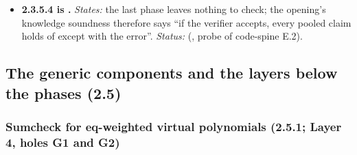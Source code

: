 \begin{itemize}[label={}, leftmargin=1.3em, itemindent=-1.3em, labelwidth=0pt, labelsep=0pt, itemsep=4pt, topsep=3pt]
\begin{itemize}[label={}, leftmargin=1.3em, itemindent=-1.3em, labelwidth=0pt, labelsep=0pt, itemsep=4pt, topsep=3pt]
\item {}\label{obl:node-2.3.5.3.1}\textbf{2.3.5.3.1 A column claim is a weighted claim} (, ; , , ). \emph{States:} a claim on column  at  is the weighted claim with weight ; the strided limb claims need the strided extension (2.5.6.3). \emph{Status:}  (probe ). \emph{See:} code-layer1 A.7, B.7.
\item {}\label{obl:node-2.3.5.3.2}\textbf{2.3.5.3.2 The pool's order and the assignment of the powers of .} \emph{Status:}  (convention \emph{Claim pool order}, ); agrees with the three sources. \emph{See:} gt-opening-compile A.2, A.6; gt-flock-ring negative results.
\item {}\label{obl:node-2.3.5.3.3}\textbf{2.3.5.3.3 The batching component} (2.5.2).
\end{itemize}
\item {}\label{obl:node-2.3.5.4}\textbf{2.3.5.4  is .} \emph{States:} the last phase leaves nothing to check; the opening's knowledge soundness therefore says ``if the verifier accepts, every pooled claim holds of  except with the error''. \emph{Status:}  (, probe of code-spine E.2).
\end{itemize}

\subsection[The generic components (2.5)]{The generic components and the layers below the phases (2.5)}\label{sec:obl-tier-generic}


\subsubsection{Sumcheck for eq-weighted virtual polynomials (2.5.1; Layer 4, holes G1 and G2)}\label{sec:obl-gen-sumcheck}

